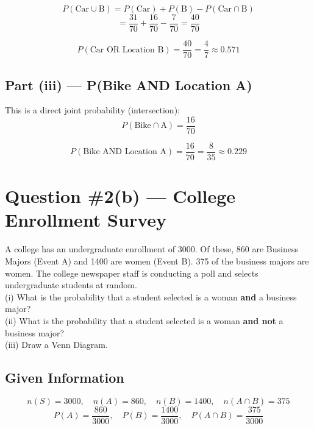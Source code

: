 \documentclass[12pt]{article}
\begin{document}
\[
  P(\text{Car} \cup \text{B}) = P(\text{Car}) + P(\text{B}) - P(\text{Car} \cap \text{B})
\]
\[
  = \frac{31}{70} + \frac{16}{70} - \frac{7}{70}
  = \frac{40}{70}
\]

\begin{answerbox}
\[
  P(\text{Car OR Location B}) = \frac{40}{70} = \frac{4}{7} \approx \mathbf{0.571}
\]
\end{answerbox}

\subsection*{Part (iii) --- P(Bike AND Location A)}

This is a direct joint probability (intersection):
\[
  P(\text{Bike} \cap \text{A}) = \frac{16}{70}
\]

\begin{answerbox}
\[
  P(\text{Bike AND Location A}) = \frac{16}{70} = \frac{8}{35} \approx \mathbf{0.229}
\]
\end{answerbox}

\newpage

\section{Question \#2(b) --- College Enrollment Survey}

\begin{problembox}
A college has an undergraduate enrollment of 3000. Of these, 860 are Business Majors (Event A) and 1400 are women (Event B). 375 of the business majors are women. The college newspaper staff is conducting a poll and selects undergraduate students at random.\\
(i)   What is the probability that a student selected is a woman \textbf{and} a business major?\\
(ii)  What is the probability that a student selected is a woman \textbf{and not} a business major?\\
(iii) Draw a Venn Diagram.
\end{problembox}

\subsection*{Given Information}

\[
  n(S) = 3000, \quad n(A) = 860, \quad n(B) = 1400, \quad n(A \cap B) = 375
\]
\[
  P(A) = \frac{860}{3000}, \quad P(B) = \frac{1400}{3000}, \quad P(A \cap B) = \frac{375}{3000}
\]
\end{document}

